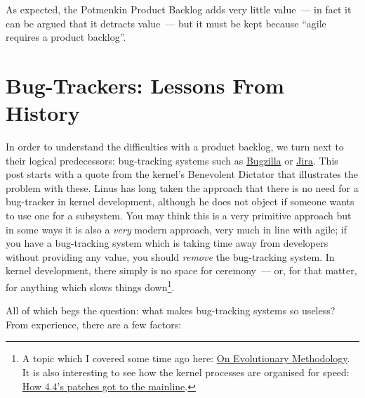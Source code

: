 \documentclass{book}
\begin{document}
As expected, the Potmenkin Product Backlog adds very little value~---
in fact it can be argued that it detracts value~--- but it must be
kept because ``agile requires a product backlog''.

\section{Bug-Trackers: Lessons From History}

In order to understand the difficulties with a product backlog, we
turn next to their logical predecessors: bug-tracking systems such as
\href{https://www.bugzilla.org/}{Bugzilla} or
\href{https://www.atlassian.com/software/jira}{Jira}. This post starts
with a quote from the kernel's Benevolent Dictator that illustrates
the problem with these. Linus has long taken the approach that there
is no need for a bug-tracker in kernel development, although he does
not object if someone wants to use one for a subsystem. You may think
this is a very primitive approach but in some ways it is also a
\emph{very} modern approach, very much in line with agile; if you have
a bug-tracking system which is taking time away from developers
without providing any value, you should \emph{remove} the bug-tracking
system. In kernel development, there simply is no space for
ceremony~--- or, for that matter, for anything which slows things
down\footnote{A topic which I covered some time ago here:
  \href{http://mcraveiro.blogspot.co.uk/2008/06/nerd-food-on-evolutionary-methodology.html}{On
    Evolutionary Methodology}. It is also interesting to see how the
  kernel processes are organised for speed:
  \href{http://lwn.net/Articles/670209/}{How 4.4's patches got to the
    mainline}.}.

All of which begs the question: what makes bug-tracking systems so
useless? From experience, there are a few factors:
\end{document}
